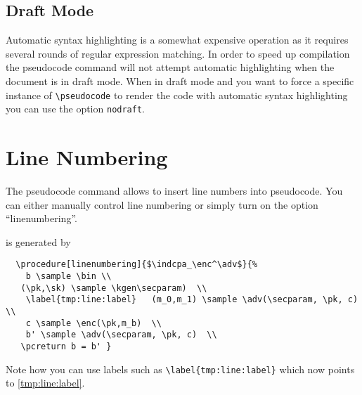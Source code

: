 \documentclass[a4paper]{report}
\begin{document}
  \subsection{Draft Mode}
  Automatic syntax highlighting is a somewhat expensive operation as it requires several rounds of regular expression matching.
  In order to speed up compilation the pseudocode command will not attempt automatic highlighting when the document is in draft mode.
  When in draft mode and you want to force a specific instance of \lstinline$\pseudocode$ to render the code with automatic syntax
  highlighting you can use the option \lstinline$nodraft$.
  
  
  \section{Line Numbering}
  The pseudocode command allows to insert line numbers into pseudocode. You can either manually control line numbering or simply turn on the option
  \enquote{linenumbering}.
  \begin{center}
  \end{center}
  is generated by 
  \begin{lstlisting}
  \procedure[linenumbering]{$\indcpa_\enc^\adv$}{%
	b \sample \bin \\
   (\pk,\sk) \sample \kgen\secparam)  \\
	\label{tmp:line:label}   (m_0,m_1) \sample \adv(\secparam, \pk, c)  \\
	c \sample \enc(\pk,m_b)  \\
	b' \sample \adv(\secparam, \pk, c)  \\
   \pcreturn b = b' }
  \end{lstlisting}
  Note how you can use labels such as \lstinline$\label{tmp:line:label}$ which now points to \ref{tmp:line:label}.
  
\end{document}
